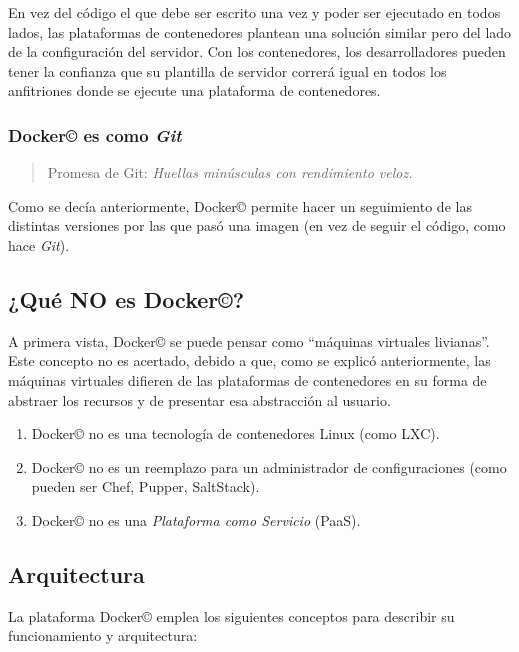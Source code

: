 \documentclass[14pt]{extarticle}
\newcommand{\docker}{Docker\copyright}
\begin{document}
            En vez del código el que debe ser escrito una vez y poder ser ejecutado en todos lados, las plataformas de contenedores plantean una solución similar pero del lado de la configuración del servidor. Con los contenedores, los desarrolladores pueden tener la confianza que su plantilla de servidor correrá igual en todos los anfitriones donde se ejecute una plataforma de contenedores.\cite{ctl}

        \subsubsection*{\docker{} es como \textit{Git}}
            \begin{quote}
                Promesa de Git: \textit{Huellas minúsculas con rendimiento veloz.}
            \end{quote}

            Como se decía anteriormente, \docker{} permite hacer un seguimiento de las distintas versiones por las que pasó una imagen (en vez de seguir el código, como hace \textit{Git}).\cite{ctl}

        \subsection{¿Qué \textbf{NO} es \docker{}?}
        A primera vista, \docker{} se puede pensar como ``máquinas virtuales livianas''. Este concepto no es acertado, debido a que, como se explicó anteriormente, las máquinas virtuales difieren de las plataformas de contenedores en su forma de abstraer los recursos y de presentar esa abstracción al usuario.

        \begin{enumerate}
            \item \docker{} no es una tecnología de contenedores Linux (como LXC).
            \item \docker{} no es un reemplazo para un administrador de configuraciones (como pueden ser Chef, Pupper, SaltStack).
            \item \docker{} no es una \textit{Plataforma como Servicio} (PaaS).\cite{ctl}
        \end{enumerate}
    \subsection{Arquitectura}
        La plataforma \docker{} emplea los siguientes conceptos para describir su funcionamiento y arquitectura: 
\end{document}
